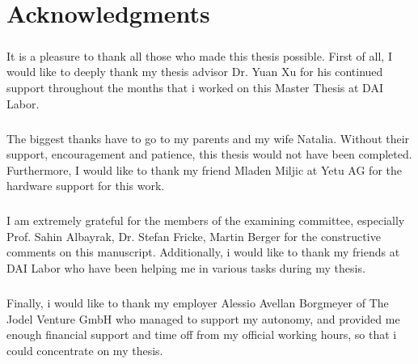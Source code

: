 \chapter*{Acknowledgments} 
\paragraph*{} It is a pleasure to thank all those who made this thesis possible. First of all, I would like to deeply thank my thesis advisor Dr. Yuan Xu for his continued support throughout the months that i worked on this Master Thesis at DAI Labor.

\paragraph*{} The biggest thanks have to go to my parents and my wife Natalia. Without their support, encouragement and patience, this thesis would not have been completed. Furthermore, I would like to thank my friend Mladen Miljic at Yetu AG for the hardware support for this work.

\paragraph*{} I am extremely grateful for the members of the examining committee, especially Prof. Sahin Albayrak, Dr. Stefan Fricke, Martin Berger for the constructive comments on this manuscript. Additionally, i would like to thank my friends at DAI Labor who have been helping me in various tasks during my thesis.

\paragraph*{} Finally, i would like to thank my employer Alessio Avellan Borgmeyer of The Jodel Venture GmbH who managed to support my autonomy, and provided me enough financial support and time off from my official working hours, so that i could concentrate on my thesis.
